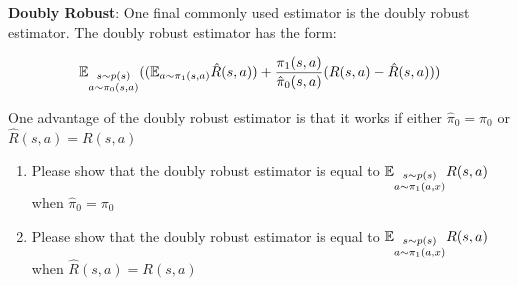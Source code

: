 \item  {} \textbf{Doubly Robust}: One final commonly used estimator is the doubly robust estimator. The doubly robust estimator has the form: 

$$\mathbb{E}_{\substack{s\sim p(s) \\ a \sim \pi_0(s, a)}}
(
(
\mathbb{E}_{\substack{a \sim \pi_1(s, a)}} \hat{R}(s, a)
) + 
\frac{\pi_1(s, a)}{\hat{\pi}_0(s, a)}  (R(s, a) - \hat{R}(s, a)))$$

One advantage of the doubly robust estimator is that it works if either $\hat{\pi}_0 = \pi_0$ or $\hat{R}(s, a) = R(s, a)$

\begin{enumerate}[label=\roman*.]
\item {} Please show that the doubly robust estimator is equal to $\mathbb{E}_{\substack{s\sim p(s) \\ a \sim \pi_1(a, x)}} R(s, a)$ when $\hat{\pi}_0 = \pi_0$
\item {} Please show that the doubly robust estimator is equal to $\mathbb{E}_{\substack{s\sim p(s) \\ a \sim \pi_1(a, x)}} R(s, a)$ when $\hat{R}(s, a) = R(s, a)$
\end{enumerate}